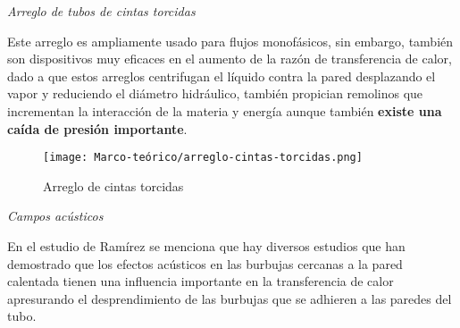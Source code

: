 				\textit{Arreglo de tubos de cintas torcidas}

				Este arreglo es ampliamente usado para flujos monofásicos, sin embargo, también son dispositivos muy eficaces en el aumento de la razón de transferencia de calor, dado a que estos arreglos centrifugan el líquido contra la pared desplazando el vapor y reduciendo el diámetro hidráulico, también propician remolinos que incrementan la interacción de la materia y energía aunque también \textbf{existe una caída de presión importante}.

				\begin{figure}[ht]
	\centering
	\texttt{[image: Marco-teórico/arreglo-cintas-torcidas.png]}
	\caption{Arreglo de cintas torcidas}
	\label{fig:cintas-torcidas}
\end{figure}

				\textit{Campos acústicos}

				En el estudio de Ramírez se menciona que hay diversos estudios que han demostrado que los efectos acústicos en las burbujas cercanas a la pared calentada tienen una influencia importante en la transferencia de calor apresurando el desprendimiento de las burbujas que se adhieren a las paredes del tubo.
	
%		
%		
%		
%	
%		
		
